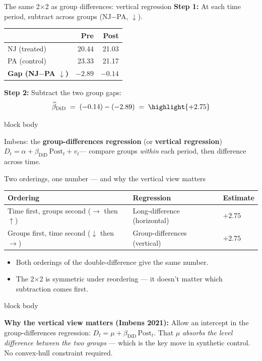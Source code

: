 \documentclass[aspectratio=169,11pt]{beamer}
\newcommand{\emphbox}[1]{%
  \begin{beamercolorbox}[rounded=true,sep=7pt,wd=\linewidth]{block body}%
    \small\color{slate}\raggedright #1%
  \end{beamercolorbox}}
\begin{document}
\begin{frame}{The same 2$\times$2 as group differences: vertical regression}
\vspace{0.1em}
\small
\textbf{Step 1:} At each time period, subtract across groups (NJ$-$PA, $\downarrow$).
\vspace{0.25em}
\begin{center}
\renewcommand{\arraystretch}{1.45}
\begin{tabular}{@{}l rr@{}}
\toprule
 & \textbf{Pre} & \textbf{Post} \\
\midrule
NJ (treated) & 20.44 & 21.03 \\
PA (control) & 23.33 & 21.17 \\
\midrule
\textbf{Gap (NJ$-$PA $\downarrow$)} & \textcolor{slate}{$-2.89$} & \textcolor{accent}{$-0.14$} \\
\bottomrule
\end{tabular}
\end{center}
\vspace{0.2em}
\textbf{Step 2:} Subtract the two group gaps:
\[
  \widehat{\beta}_{\text{DiD}} \;=\; (-0.14) - (-2.89) \;=\; \highlight{+2.75}
\]
\emphbox{Imbens: the \textbf{group-differences regression} (or \textbf{vertical regression})\\[3pt]
$D_t = \alpha + \beta_{\text{DiD}}\,\text{Post}_t + v_t$\quad --- compare groups \textit{within} each period, then difference across time.}
\end{frame}

\begin{frame}{Two orderings, one number --- and why the vertical view matters}
\vspace{0.2em}
\begin{center}
\renewcommand{\arraystretch}{1.45}
\small
\begin{tabular}{@{}lll@{}}
\toprule
\textbf{Ordering} & \textbf{Regression} & \textbf{Estimate} \\
\midrule
Time first, groups second ($\rightarrow$ then $\uparrow$) & Long-difference (horizontal) & $+2.75$ \\
Groups first, time second ($\downarrow$ then $\rightarrow$) & Group-differences (vertical) & $+2.75$ \\
\bottomrule
\end{tabular}
\end{center}
\vspace{0.4em}
\begin{itemize}\small
  \item Both orderings of the double-difference give the same number.
  \item The 2$\times$2 is symmetric under reordering --- it doesn't matter which subtraction comes first.
\end{itemize}
\vspace{0.2em}
\emphbox{\textbf{Why the vertical view matters (Imbens 2021):} Allow an intercept in the group-differences regression: $D_t = \mu + \beta_{\text{DiD}}\,\text{Post}_t$. That $\mu$ \textit{absorbs the level difference between the two groups} --- which is the key move in synthetic control. No convex-hull constraint required.}
\end{frame}
\end{document}
